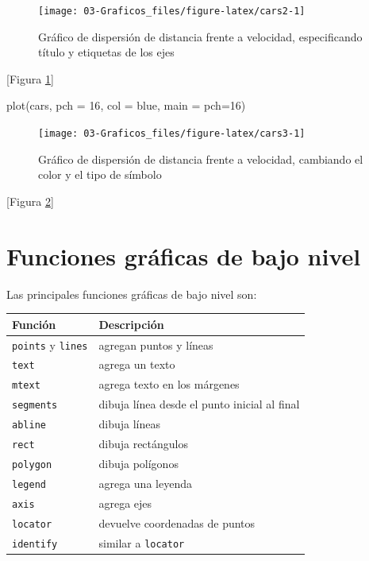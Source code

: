 \documentclass[
]{book}
\newenvironment{Shaded}{\begin{snugshade}}{\end{snugshade}}
\newcommand{\AttributeTok}[1]{\textcolor[rgb]{0.77,0.63,0.00}{#1}}
\newcommand{\DecValTok}[1]{\textcolor[rgb]{0.00,0.00,0.81}{#1}}
\newcommand{\FunctionTok}[1]{\textcolor[rgb]{0.00,0.00,0.00}{#1}}
\newcommand{\NormalTok}[1]{#1}
\newcommand{\StringTok}[1]{\textcolor[rgb]{0.31,0.60,0.02}{#1}}
\theoremstyle{break}
\begin{document}
\begin{figure}[!htb]

{\centering \texttt{[image: 03-Graficos\_files/figure-latex/cars2-1]} 

}

\caption{Gráfico de dispersión de distancia frente a velocidad, especificando título y etiquetas de los ejes}\label{fig:cars2}
\end{figure}

{[}Figura \ref{fig:cars2}{]}

\begin{Shaded}
\begin{Highlighting}[]
\FunctionTok{plot}\NormalTok{(cars, }\AttributeTok{pch =} \DecValTok{16}\NormalTok{, }\AttributeTok{col =} \StringTok{\textquotesingle{}blue\textquotesingle{}}\NormalTok{, }\AttributeTok{main =} \StringTok{\textquotesingle{}pch=16\textquotesingle{}}\NormalTok{)}
\end{Highlighting}
\end{Shaded}

\begin{figure}[!htb]

{\centering \texttt{[image: 03-Graficos\_files/figure-latex/cars3-1]} 

}

\caption{Gráfico de dispersión de distancia frente a velocidad, cambiando el color y el tipo de símbolo}\label{fig:cars3}
\end{figure}

{[}Figura \ref{fig:cars3}{]}

\hypertarget{funciones-gruxe1ficas-de-bajo-nivel}{%
\section{Funciones gráficas de bajo nivel}\label{funciones-gruxe1ficas-de-bajo-nivel}}

Las principales funciones gráficas de bajo nivel son:

\begin{longtable}[]{@{}ll@{}}
\toprule
Función & Descripción \\
\midrule
\endhead
\texttt{points} y \texttt{lines} & agregan puntos y líneas \\
\texttt{text} & agrega un texto \\
\texttt{mtext} & agrega texto en los márgenes \\
\texttt{segments} & dibuja línea desde el punto inicial al final \\
\texttt{abline} & dibuja líneas \\
\texttt{rect} & dibuja rectángulos \\
\texttt{polygon} & dibuja polígonos \\
\texttt{legend} & agrega una leyenda \\
\texttt{axis} & agrega ejes \\
\texttt{locator} & devuelve coordenadas de puntos \\
\texttt{identify} & similar a \texttt{locator} \\
\bottomrule
\end{longtable}
\end{document}
